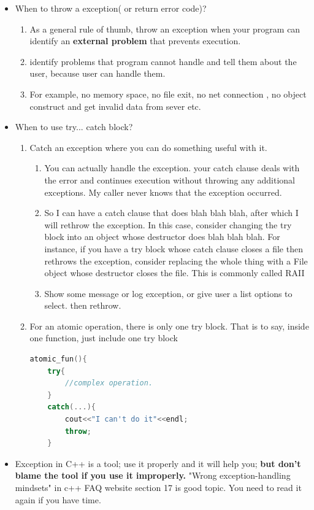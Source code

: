 \documentclass[a4paper,11pt,twoside]{book}
\begin{document}
\begin{itemize}
	
	\item When to throw a exception( or return error code)?
	\begin{enumerate}
		\item As a general rule of thumb, throw an exception when your program can identify an \textbf{external problem} that prevents execution.
		\item identify problems that program cannot handle and tell them about the user, because user can handle them.
		\item For example, no memory space, no file exit, no net connection , no object construct and get invalid data from sever etc.
	\end{enumerate}
	
	\item When to use try... catch block?
	\begin{enumerate}
		\item Catch an exception where you can do something useful with it.
		\begin{enumerate}
			\item You can actually handle the exception. your catch clause deals with the error and continues execution without throwing any additional exceptions. My caller never knows that the exception occurred.
			\item So I can have a catch clause that does blah blah blah, after which I will rethrow the exception. In this case, consider changing the try block into an object whose destructor does blah blah blah. For instance, if you have a try block whose catch clause closes a file then rethrows the exception, consider replacing the whole thing with a File object whose destructor closes the file. This is commonly called RAII
			\item Show some message or log exception, or give user a list options to select.  then rethrow.
		\end{enumerate}
		
		\item For an atomic operation, there is only one try block. That is to say, inside one function, just include one try block
\begin{lstlisting}[frame=single, language=c++]
atomic_fun(){
	try{
		//complex operation.
	}
	catch(...){
		cout<<"I can't do it"<<endl;
		throw;
	}
\end{lstlisting}
	\end{enumerate}
	
	\item Exception in C++ is a tool; use it properly and it will help you; \textbf{but don't blame the tool if you use it improperly.} "Wrong exception-handling mindsets" in c++ FAQ website section 17 is good topic. You need to read it again if you have time.
	
\end{itemize}
\end{document}
